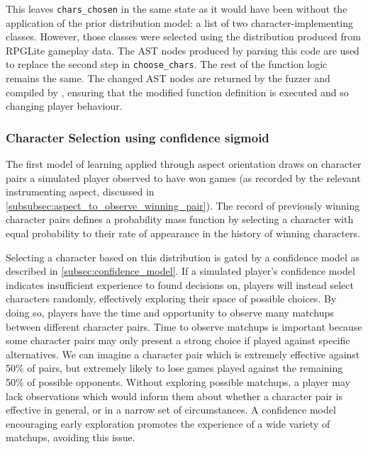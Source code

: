 This leaves \lstinline{chars_chosen} in the same state as it would have been
without the application of the prior distribution model: a list of two
character-implementing classes. However, those classes were selected using the
distribution produced from RPGLite gameplay data. The AST nodes produced by
parsing this code are used to replace the second step in
\lstinline{choose_chars}. The rest of the function logic remains the same. The
changed AST nodes are returned by the fuzzer and compiled by \pdsf{}, ensuring
that the modified function definition is executed and so changing player
behaviour.



\subsubsection{Character Selection using confidence sigmoid}
\label{subsubsec:learning_by_picking_from_distribution_of_wins_with_confidence}

The first model of learning applied through aspect orientation draws on
character pairs a simulated player observed to have won games (as recorded by
the relevant instrumenting aspect, discussed in
\cref{subsubsec:aspect_to_observe_winning_pair}). The record of previously
winning character pairs defines a probability mass function by selecting a
character with equal probability to their rate of appearance in the history of
winning characters.

Selecting a character based on this distribution is gated by a confidence model
as described in \cref{subsec:confidence_model}. If a simulated player's
confidence model indicates insufficient experience to found decisions on,
players will instead select characters randomly, effectively exploring their
space of possible choices. By doing so, players have the time and opportunity to
observe many matchups between different character pairs. Time to observe
matchups is important because some character pairs may only present a strong
choice if played against specific alternatives. We can imagine a character pair
which is extremely effective against 50\% of pairs, but extremely likely to lose
games played against the remaining 50\% of possible opponents. Without exploring
possible matchups, a player may lack observations which would inform them about
whether a character pair is effective in general, or in a narrow set of
circumstances. A confidence model encouraging early exploration promotes the
experience of a wide variety of matchups, avoiding this issue.

